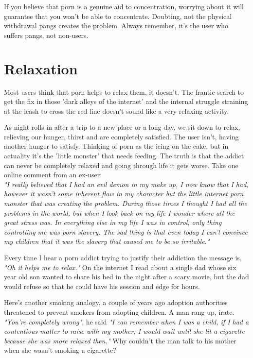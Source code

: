 \documentclass[easypeasy.tex]{subfiles}
\begin{document}
If you believe that porn is a genuine aid to concentration, worrying about it will guarantee that you won't be able to concentrate. Doubting, not the physical withdrawal pangs creates the problem. Always remember, it's the user who suffers pangs, not non-users.

\section{Relaxation}

Most users think that porn helps to relax them, it doesn't. The frantic search to get the fix in those 'dark alleys of the internet' and the internal struggle straining at the leash to cross the red line doesn't sound like a very relaxing activity.

As night rolls in after a trip to a new place or a long day, we sit down to relax, relieving our hunger, thirst and are completely satisfied. The user isn't, having another hunger to satisfy. Thinking of porn as the icing on the cake, but in actuality it's the 'little monster' that needs feeding. The truth is that the addict can never be completely relaxed and going through life it gets worse. Take one online comment from an ex-user: \\
  \textit{"I really believed that I had an evil demon in my make up, I now know that I had, however it wasn't some inherent flaw in my character but the little internet porn monster that was creating the problem. During those times I thought I had all the problems in the world, but when I look back on my life I wonder where all the great stress was. In everything else in my life I was in control, only thing controlling me was porn slavery. The sad thing is that even today I can't convince my children that it was the slavery that caused me to be so irritable."}

Every time I hear a porn addict trying to justify their addiction the message is, \textit{"Oh it helps me to relax."} On the internet I read about a single dad whose six year old son wanted to share his bed in the night after a scary movie, but the dad would refuse so that he could have his session and edge for hours.

Here's another smoking analogy, a couple of years ago adoption authorities threatened to prevent smokers from adopting children. A man rang up, irate. \textit{"You're completely wrong"}, he said \textit{"I can remember when I was a child, if I had a contentious matter to raise with my mother, I would wait until she lit a cigarette because she was more relaxed then."} Why couldn't the man talk to his mother when she wasn't smoking a cigarette?
\end{document}
